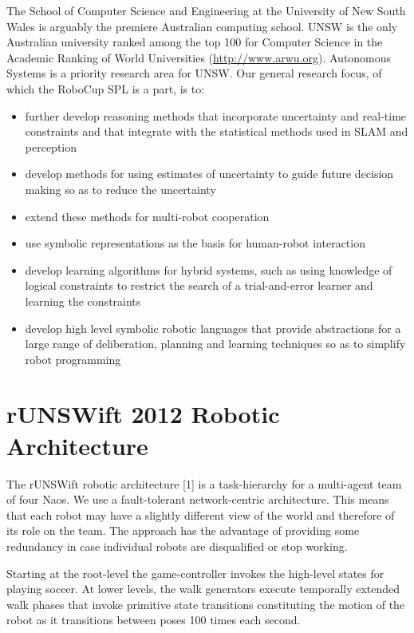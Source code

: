 \documentclass[runningheads,a4paper]{llncs}
\begin{document}
The School of Computer Science and Engineering at the University of New South Wales is arguably the premiere Australian computing school. UNSW is the only Australian university ranked among the top 100 for Computer Science in the Academic Ranking of World Universities (\url{http://www.arwu.org}). Autonomous Systems is a priority research area for UNSW. Our general research focus, of which the RoboCup SPL is a part, is to:
\begin{itemize}
\item further develop reasoning methods that incorporate uncertainty and real-time constraints and that integrate with the statistical methods used in SLAM and perception
\item develop methods for using estimates of uncertainty to guide future decision making so as to reduce the uncertainty 
\item extend these methods for multi-robot cooperation
\item use symbolic representations as the basis for human-robot interaction
\item develop learning algorithms for hybrid systems, such as using knowledge of logical constraints to restrict the search of a trial-and-error learner and learning the constraints
\item develop high level symbolic robotic languages that provide abstractions for a large range of deliberation, planning and learning techniques so as to simplify robot programming
\end{itemize}


\section{rUNSWift 2012 Robotic Architecture} \label{sectionRoboticArchitecture2011}

The rUNSWift robotic architecture [1] is a task-hierarchy for a multi-agent team of four Naos. We use a fault-tolerant network-centric architecture. This means that each robot may have a slightly different view of the world and therefore of its role on the team. The approach has the advantage of providing some redundancy in case individual robots are disqualified or stop working.

Starting at the root-level the game-controller invokes the high-level states for playing soccer. At lower levels, the walk generators execute temporally extended walk phases that invoke primitive state transitions constituting the motion of the robot as it transitions between poses 100 times each second. 
\end{document}
